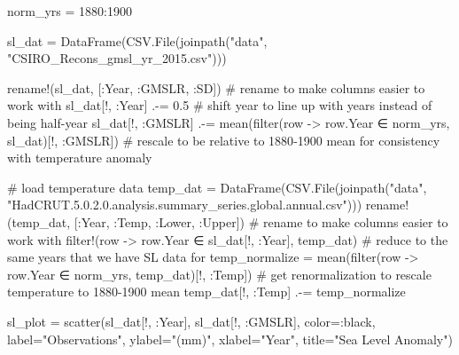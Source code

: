 \documentclass[
  letterpaper,
  DIV=11,
  numbers=noendperiod]{scrartcl}
\newenvironment{Shaded}{\begin{snugshade}}{\end{snugshade}}
\newcommand{\CommentTok}[1]{\textcolor[rgb]{0.37,0.37,0.37}{#1}}
\newcommand{\FloatTok}[1]{\textcolor[rgb]{0.68,0.00,0.00}{#1}}
\newcommand{\FunctionTok}[1]{\textcolor[rgb]{0.28,0.35,0.67}{#1}}
\newcommand{\NormalTok}[1]{\textcolor[rgb]{0.00,0.23,0.31}{#1}}
\newcommand{\OperatorTok}[1]{\textcolor[rgb]{0.37,0.37,0.37}{#1}}
\newcommand{\StringTok}[1]{\textcolor[rgb]{0.13,0.47,0.30}{#1}}
\begin{document}
\begin{Shaded}
\begin{Highlighting}[]
\NormalTok{norm\_yrs }\OperatorTok{=} \FloatTok{1880}\OperatorTok{:}\FloatTok{1900}

\NormalTok{sl\_dat }\OperatorTok{=} \FunctionTok{DataFrame}\NormalTok{(CSV.}\FunctionTok{File}\NormalTok{(}\FunctionTok{joinpath}\NormalTok{(}\StringTok{"data"}\NormalTok{,  }\StringTok{"CSIRO\_Recons\_gmsl\_yr\_2015.csv"}\NormalTok{)))}

\FunctionTok{rename!}\NormalTok{(sl\_dat, [}\OperatorTok{:}\NormalTok{Year, }\OperatorTok{:}\NormalTok{GMSLR, }\OperatorTok{:}\NormalTok{SD]) }\CommentTok{\# rename to make columns easier to work with}
\NormalTok{sl\_dat[!, }\OperatorTok{:}\NormalTok{Year] }\OperatorTok{.{-}=} \FloatTok{0.5} \CommentTok{\# shift year to line up with years instead of being half{-}year }
\NormalTok{sl\_dat[!, }\OperatorTok{:}\NormalTok{GMSLR] }\OperatorTok{.{-}=} \FunctionTok{mean}\NormalTok{(}\FunctionTok{filter}\NormalTok{(row }\OperatorTok{{-}\textgreater{}}\NormalTok{ row.Year }\OperatorTok{∈}\NormalTok{ norm\_yrs, sl\_dat)[!, }\OperatorTok{:}\NormalTok{GMSLR]) }\CommentTok{\# rescale to be relative to 1880{-}1900 mean for consistency with temperature anomaly}

\CommentTok{\# load temperature data}
\NormalTok{temp\_dat }\OperatorTok{=} \FunctionTok{DataFrame}\NormalTok{(CSV.}\FunctionTok{File}\NormalTok{(}\FunctionTok{joinpath}\NormalTok{(}\StringTok{"data"}\NormalTok{, }\StringTok{"HadCRUT.5.0.2.0.analysis.summary\_series.global.annual.csv"}\NormalTok{)))}
\FunctionTok{rename!}\NormalTok{(temp\_dat, [}\OperatorTok{:}\NormalTok{Year, }\OperatorTok{:}\NormalTok{Temp, }\OperatorTok{:}\NormalTok{Lower, }\OperatorTok{:}\NormalTok{Upper]) }\CommentTok{\# rename to make columns easier to work with}
\FunctionTok{filter!}\NormalTok{(row }\OperatorTok{{-}\textgreater{}}\NormalTok{ row.Year }\OperatorTok{∈}\NormalTok{ sl\_dat[!, }\OperatorTok{:}\NormalTok{Year], temp\_dat) }\CommentTok{\# reduce to the same years that we have SL data for}
\NormalTok{temp\_normalize }\OperatorTok{=} \FunctionTok{mean}\NormalTok{(}\FunctionTok{filter}\NormalTok{(row }\OperatorTok{{-}\textgreater{}}\NormalTok{ row.Year }\OperatorTok{∈}\NormalTok{ norm\_yrs, temp\_dat)[!, }\OperatorTok{:}\NormalTok{Temp]) }\CommentTok{\# get renormalization to rescale temperature to 1880{-}1900 mean}
\NormalTok{temp\_dat[!, }\OperatorTok{:}\NormalTok{Temp] }\OperatorTok{.{-}=}\NormalTok{ temp\_normalize}


\NormalTok{sl\_plot }\OperatorTok{=} \FunctionTok{scatter}\NormalTok{(sl\_dat[!, }\OperatorTok{:}\NormalTok{Year], sl\_dat[!, }\OperatorTok{:}\NormalTok{GMSLR], color}\OperatorTok{=:}\NormalTok{black, label}\OperatorTok{=}\StringTok{"Observations"}\NormalTok{, ylabel}\OperatorTok{=}\StringTok{"(mm)"}\NormalTok{, xlabel}\OperatorTok{=}\StringTok{"Year"}\NormalTok{, title}\OperatorTok{=}\StringTok{"Sea Level Anomaly"}\NormalTok{)}


\end{Highlighting}
\end{Shaded}
\end{document}
